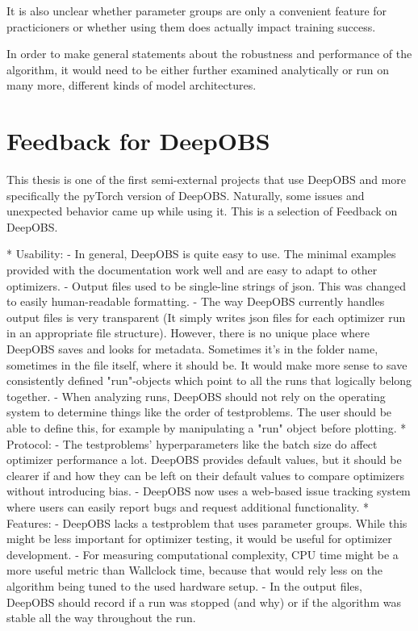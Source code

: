 \documentclass[twoside,12pt,a4paper]{report}
\begin{document}
It is also unclear whether parameter groups are only a convenient feature for practicioners or whether using them does actually impact training success.

In order to make general statements about the robustness and performance of the algorithm, it would need to be either further examined analytically or run on many more, different kinds of model architectures.

\section{Feedback for DeepOBS}
This thesis is one of the first semi-external projects that use DeepOBS and more specifically the pyTorch version of DeepOBS. Naturally, some issues and unexpected behavior came up while using it. This is a selection of Feedback on DeepOBS.

\begin{markdown}
* Usability:
	- In general, DeepOBS is quite easy to use. The minimal examples provided with the documentation work well and are easy to adapt to other optimizers.
	- Output files used to be single-line strings of json. This was changed to easily human-readable formatting.
	- The way DeepOBS currently handles output files is very transparent (It simply writes json files for each optimizer run in an appropriate file structure). However, there is no unique place where DeepOBS saves and looks for metadata. Sometimes it's in the folder name, sometimes in the file itself, where it should be. It would make more sense to save consistently defined "run"-objects which point to all the runs that logically belong together.
	- When analyzing runs, DeepOBS should not rely on the operating system to determine things like the order of testproblems. The user should be able to define this, for example by manipulating a "run" object before plotting.
* Protocol: 
	- The testproblems' hyperparameters like the batch size do affect optimizer performance a lot. DeepOBS provides default values, but it should be clearer if and how they can be left on their default values to compare optimizers without introducing bias.
	- DeepOBS now uses a web-based issue tracking system where users can easily report bugs and request additional functionality.
* Features:
	- DeepOBS lacks a testproblem that uses parameter groups. While this might be less important for optimizer testing, it would be useful for optimizer development.
	- For measuring computational complexity, CPU time might be a more useful metric than Wallclock time, because that would rely less on the algorithm being tuned to the used hardware setup.
	- In the output files, DeepOBS should record if a run was stopped (and why) or if the algorithm was stable all the way throughout the run.
\end{markdown}
\end{document}
